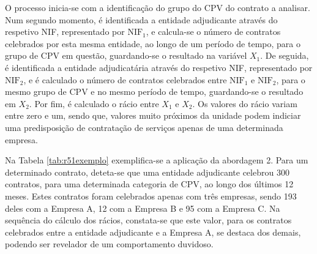 O processo inicia-se com a identificação do grupo do CPV do contrato a analisar. Num segundo momento, é identificada a entidade adjudicante através do respetivo NIF, representado por $\text{NIF}_1$, e calcula-se o número de contratos celebrados por esta mesma entidade, ao longo de um período de tempo, para o grupo de CPV em questão, guardando-se o resultado na variável $X_1$. De seguida, é identificada a entidade adjudicatária através do respetivo NIF, representado por $\text{NIF}_2$, e é calculado o número de contratos celebrados entre $\text{NIF}_1$ e $\text{NIF}_2$, para o mesmo grupo de CPV e no mesmo período de tempo, guardando-se o resultado em $X_2$. Por fim, é calculado o rácio entre $X_1$ e $X_2$. Os valores do rácio variam entre zero e um, sendo que, valores muito próximos da unidade podem indiciar uma predisposição de contratação de serviços apenas de uma determinada empresa. 

Na Tabela \ref{tab:r51exemplo} exemplifica-se a aplicação da abordagem 2. Para um determinado contrato, deteta-se que uma entidade adjudicante celebrou 300 contratos, para uma determinada categoria de CPV, ao longo dos últimos 12 meses. Estes contratos foram celebrados apenas com três empresas, sendo 193 deles com a Empresa A, 12 com a Empresa B e 95 com a Empresa C. Na sequência do cálculo dos rácios, constata-se que este valor, para os contratos celebrados entre a entidade adjudicante e a Empresa A, se destaca dos demais, podendo ser revelador de um comportamento duvidoso. 

\begin{table}[H]
	\centering
	\renewcommand{\arraystretch}{1.15}
	\setlength{\tabcolsep}{15pt}
	\caption{Exemplo de ilustração da abordagem 2 para uma entidade adjudicante e conjunto de empresas fictícias.}
	\label{tab:r51exemplo}
\end{table}



